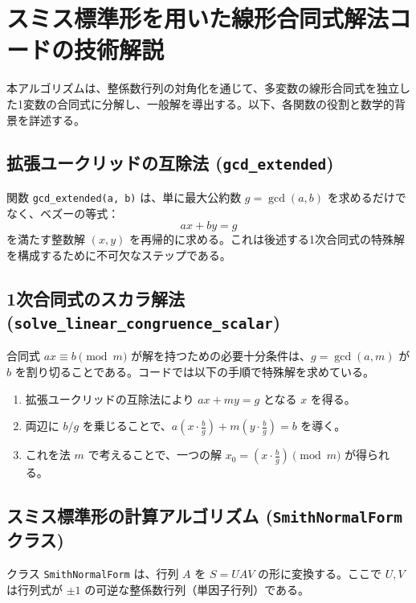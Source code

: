 \documentclass[a4paper,11pt,dvipdfmx]{jsarticle}
\theoremstyle{definition}
\begin{document}
\title{}
\author{}
\date{\today}
\maketitle
\section{スミス標準形を用いた線形合同式解法コードの技術解説}

本アルゴリズムは、整係数行列の対角化を通じて、多変数の線形合同式を独立した1変数の合同式に分解し、一般解を導出する。以下、各関数の役割と数学的背景を詳述する。

\subsection{拡張ユークリッドの互除法 (\texttt{gcd\_extended})}
関数 \texttt{gcd\_extended(a, b)} は、単に最大公約数 $g = \gcd(a, b)$ を求めるだけでなく、ベズーの等式：
\begin{equation}
    ax + by = g
\end{equation}
を満たす整数解 $(x, y)$ を再帰的に求める。これは後述する1次合同式の特殊解を構成するために不可欠なステップである。

\subsection{1次合同式のスカラ解法 (\texttt{solve\_linear\_congruence\_scalar})}
合同式 $ax \equiv b \pmod{m}$ が解を持つための必要十分条件は、$g = \gcd(a, m)$ が $b$ を割り切ることである。コードでは以下の手順で特殊解を求めている。
\begin{enumerate}
    \item 拡張ユークリッドの互除法により $ax + my = g$ となる $x$ を得る。
    \item 両辺に $b/g$ を乗じることで、$a(x \cdot \frac{b}{g}) + m(y \cdot \frac{b}{g}) = b$ を導く。
    \item これを法 $m$ で考えることで、一つの解 $x_0 = (x \cdot \frac{b}{g}) \pmod{m}$ が得られる。
\end{enumerate}

\subsection{スミス標準形の計算アルゴリズム (\texttt{SmithNormalForm} クラス)}
クラス \texttt{SmithNormalForm} は、行列 $A$ を $S = UAV$ の形に変換する。ここで $U, V$ は行列式が $\pm 1$ の可逆な整係数行列（単因子行列）である。
\end{document}
